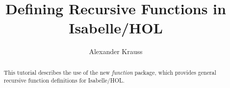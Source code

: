 \documentclass[11pt,a4paper,fleqn]{article}
\title{Defining Recursive Functions in Isabelle/HOL}
\author{Alexander Krauss}
\begin{document}
\maketitle

\begin{abstract}
  This tutorial describes the use of the new \emph{function} package,
	which provides general recursive function definitions for Isabelle/HOL.
	

\end{abstract}






\begingroup
 \small\raggedright\frenchspacing

\endgroup
\end{document}

